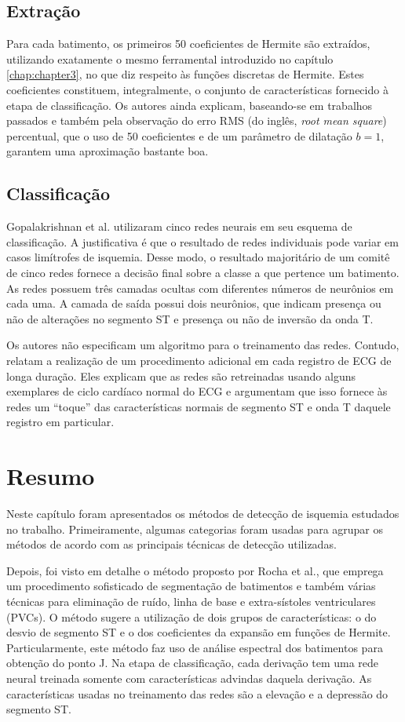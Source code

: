 \subsection*{Extração}
Para cada batimento, os primeiros 50 coeficientes de Hermite são extraídos, utilizando exatamente o mesmo ferramental introduzido no capítulo \ref{chap:chapter3}, no que diz respeito às funções discretas de Hermite. Estes coeficientes constituem, integralmente, o conjunto de características fornecido à etapa de classificação. Os autores ainda explicam, baseando-se em trabalhos passados e também pela observação do erro RMS (do inglês, \emph{root mean square}) percentual, que o uso de 50 coeficientes e de um parâmetro de dilatação $b=1$, garantem uma aproximação bastante boa.

\subsection*{Classificação}
Gopalakrishnan et al. utilizaram cinco redes neurais em seu esquema de classificação. A justificativa é que o resultado de redes individuais pode variar em casos limítrofes de isquemia. Desse modo, o resultado majoritário de um comitê de cinco redes fornece a decisão final sobre a classe a que pertence um batimento. As redes possuem três camadas ocultas com diferentes números de neurônios em cada uma. A camada de saída possui dois neurônios, que indicam presença ou não de alterações no segmento ST e presença ou não de inversão da onda T.

Os autores não especificam um algoritmo para o treinamento das redes. Contudo, relatam a realização de um procedimento adicional em cada registro de ECG de longa duração. Eles explicam que as redes são retreinadas usando alguns exemplares de ciclo cardíaco normal do ECG e argumentam que isso fornece às redes um ``toque'' das características normais de segmento ST e onda T daquele registro em particular.


\section{Resumo}
Neste capítulo foram apresentados os métodos de detecção de isquemia estudados no trabalho. Primeiramente, algumas categorias foram usadas para agrupar os métodos de acordo com as principais técnicas de detecção utilizadas.

Depois, foi visto em detalhe o método proposto por Rocha et al., que emprega um procedimento sofisticado de segmentação de batimentos e também várias técnicas para eliminação de ruído, linha de base e extra-sístoles ventriculares (PVCs). O método sugere a utilização de dois grupos de características: o do desvio de segmento ST e o dos coeficientes da expansão em funções de Hermite. Particularmente, este método faz uso de análise espectral dos batimentos para obtenção do ponto J. Na etapa de classificação, cada derivação tem uma rede neural treinada somente com características advindas daquela derivação. As características usadas no treinamento das redes são a elevação e a depressão do segmento ST.

